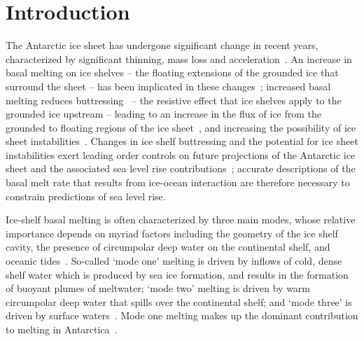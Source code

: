 \documentclass[openacc]{rsproca_new}%
\begin{document}
\begin{fmtext}

\end{fmtext}
\maketitle
\section{Introduction}\label{S:Introduction}
The Antarctic ice sheet has undergone significant change in recent years, characterized by significant thinning, mass loss and acceleration~\cite{Pritchard2012Nature, Mouginot2014GRL, Paolo2015Science, Rignot2019PNAS}. An increase in basal melting on ice shelves -- the floating extensions of the grounded ice that surround the sheet -- has been implicated in these changes~\cite{Shepherd2004GRL, Jenkins2010NatureGeo, Hellmer2012Nature}; increased basal melting reduces buttressing~\citep{Gagliardini2010GRL, Goldberg2019GRL} -- the resistive effect that ice shelves apply to the grounded ice upstream -- leading to an increase in the flux of ice from the grounded to floating regions of the ice sheet~\citep{Gudmundsson2013Cryo}, and increasing the possibility of ice sheet instabilities~\citep{Schoof2007JGeophysResEarth,Vaughan2007Science}. Changes in ice shelf buttressing and  the potential for ice sheet instabilities exert leading order controls on future projections of the Antarctic ice sheet and the associated sea level rise contributions~\citep{DeConto2016Nature, Arthern2017GRL}; accurate descriptions of the basal melt rate that results from ice-ocean interaction are therefore necessary to constrain predictions of sea level rise. 

Ice-shelf basal melting is often characterized by three main modes, whose relative importance depends on myriad factors including the geometry of the ice shelf cavity, the presence of circumpolar deep water on the continental shelf, and oceanic tides~\citep{Jacobs1992JGlac}. So-called `mode one' melting is driven by inflows of cold, dense shelf water which is produced by sea ice formation, and results in the formation of buoyant plumes of meltwater; `mode two' melting is driven by warm circumpolar deep water that spills over the continental shelf; and `mode three' is driven by surface waters~\citep{Silvano2016Oceanography}. Mode one melting makes up the dominant contribution to melting in Antarctica~\citep{Adusumilli2020NatureGeo}.
\end{document}
